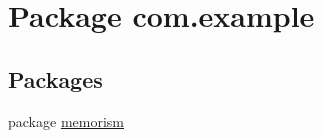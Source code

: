 \hypertarget{namespacecom_1_1example}{}\section{Package com.\+example}
\label{namespacecom_1_1example}
\subsection*{Packages}
\begin{DoxyCompactItemize}
\item 
package \hyperlink{namespacecom_1_1example_1_1memorism}{memorism}
\end{DoxyCompactItemize}
